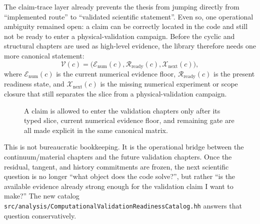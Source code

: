 The claim-trace layer already prevents the thesis from jumping directly from
``implemented route'' to ``validated scientific statement''. Even so, one
operational ambiguity remained open: a claim can be correctly located in the
code and still not be ready to enter a physical-validation campaign. Before the
cyclic and structural chapters are used as high-level evidence, the library
therefore needs one more canonical statement:
\[
  \mathcal{V}(c)
  =
  \Big(\mathcal{E}_{\mathrm{num}}(c),
       \mathcal{R}_{\mathrm{ready}}(c),
       \mathcal{X}_{\mathrm{next}}(c)\Big),
\]
where \(\mathcal{E}_{\mathrm{num}}(c)\) is the current numerical evidence
floor, \(\mathcal{R}_{\mathrm{ready}}(c)\) is the present readiness state, and
\(\mathcal{X}_{\mathrm{next}}(c)\) is the missing numerical experiment or scope
closure that still separates the slice from a physical-validation campaign.

\begin{figure}[htbp]
  \centering
  \caption{A claim is allowed to enter the validation chapters only after its
  typed slice, current numerical evidence floor, and remaining gate are all
  made explicit in the same canonical matrix.}
  \label{fig:stage1-validation-readiness}
\end{figure}

This is not bureaucratic bookkeeping. It is the operational bridge between the
continuum/material chapters and the future validation chapters. Once the
residual, tangent, and history commitments are frozen, the next scientific
question is no longer ``what object does the code solve?'', but rather ``is the
available evidence already strong enough for the validation claim I want to
make?'' The new catalog
\texttt{src/analysis/ComputationalValidationReadinessCatalog.hh} answers that
question conservatively.

